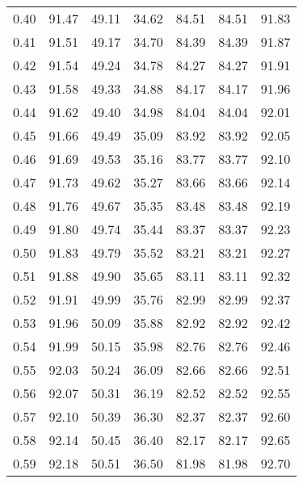 \begin{tabular}{|c|c|c|c|c|c|c|}
      0.40 &     91.47 &     49.11 &      34.62 &   84.51 &      84.51 &         91.83 \\
      0.41 &     91.51 &     49.17 &      34.70 &   84.39 &      84.39 &         91.87 \\
      0.42 &     91.54 &     49.24 &      34.78 &   84.27 &      84.27 &         91.91 \\
      0.43 &     91.58 &     49.33 &      34.88 &   84.17 &      84.17 &         91.96 \\
      0.44 &     91.62 &     49.40 &      34.98 &   84.04 &      84.04 &         92.01 \\
      0.45 &     91.66 &     49.49 &      35.09 &   83.92 &      83.92 &         92.05 \\
      0.46 &     91.69 &     49.53 &      35.16 &   83.77 &      83.77 &         92.10 \\
      0.47 &     91.73 &     49.62 &      35.27 &   83.66 &      83.66 &         92.14 \\
      0.48 &     91.76 &     49.67 &      35.35 &   83.48 &      83.48 &         92.19 \\
      0.49 &     91.80 &     49.74 &      35.44 &   83.37 &      83.37 &         92.23 \\
      0.50 &     91.83 &     49.79 &      35.52 &   83.21 &      83.21 &         92.27 \\
      0.51 &     91.88 &     49.90 &      35.65 &   83.11 &      83.11 &         92.32 \\
      0.52 &     91.91 &     49.99 &      35.76 &   82.99 &      82.99 &         92.37 \\
      0.53 &     91.96 &     50.09 &      35.88 &   82.92 &      82.92 &         92.42 \\
      0.54 &     91.99 &     50.15 &      35.98 &   82.76 &      82.76 &         92.46 \\
      0.55 &     92.03 &     50.24 &      36.09 &   82.66 &      82.66 &         92.51 \\
      0.56 &     92.07 &     50.31 &      36.19 &   82.52 &      82.52 &         92.55 \\
      0.57 &     92.10 &     50.39 &      36.30 &   82.37 &      82.37 &         92.60 \\
      0.58 &     92.14 &     50.45 &      36.40 &   82.17 &      82.17 &         92.65 \\
      0.59 &     92.18 &     50.51 &      36.50 &   81.98 &      81.98 &         92.70 \\

\end{tabular}
